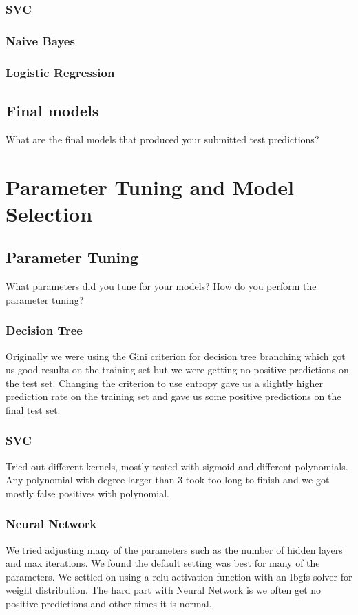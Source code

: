 \documentclass[11pt,a4paper]{article}
\begin{document}
		\subsubsection{SVC}

		\subsubsection{Naive Bayes}

		\subsubsection{Logistic Regression}

	\subsection{Final models}
		What are the final models that produced your submitted test predictions?

\section{Parameter Tuning and Model Selection }
	\subsection{Parameter Tuning}
		What parameters did you tune for your models?
		How do you perform the parameter tuning?

		\subsubsection{Decision Tree}
			Originally we were using the Gini criterion for decision tree branching which got us good results on the training set but we were getting no positive predictions on the test set.
			Changing the criterion to use entropy gave us a slightly higher prediction rate on the training set and gave us some positive predictions on the final test set.

		\subsubsection{SVC}
			Tried out different kernels, mostly tested with sigmoid and different polynomials.
			Any polynomial with degree larger than 3 took too long to finish and we got mostly false positives with polynomial.

		\subsubsection{Neural Network}
			We tried adjusting many of the parameters such as the number of hidden layers and max iterations.
			We found the default setting was best for many of the parameters.
			We settled on using a relu activation function with an Ibgfs solver for weight distribution.
			The hard part with Neural Network is we often get no positive predictions and other times it is normal.
\end{document}
